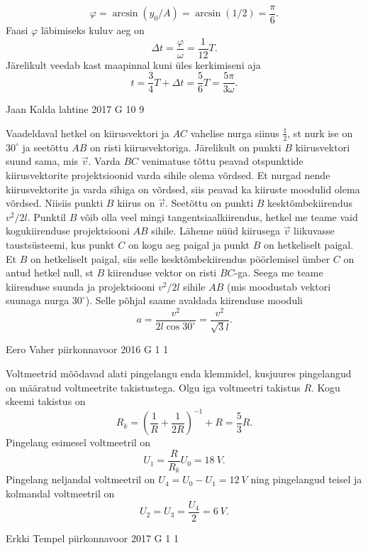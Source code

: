 \documentclass[11pt]{article}
\begin{document}
{{\[
\varphi = \arcsin(y_0/A) = \arcsin(1/2) = \frac{\pi}{6}.
\]
Faasi $\varphi$ läbimiseks kuluv aeg on
\[
\Delta t = \frac{\varphi}{\omega}=\frac{1}{12}T.
\]
Järelikult veedab kast maapinnal kuni üles kerkimiseni aja
\[
t = \frac{3}{4}T + \Delta t = \frac{5}{6}T = \frac{5\pi}{3\omega}.
\]
\fi
}

{Jaan Kalda} %
{lahtine} %
{2017} %
{G 10} %
{9} %
{

\ifSolution
Vaadeldaval hetkel on kiirusvektori ja $AC$ vahelise nurga siinus $\frac 12$, st nurk ise on $30^\circ$ ja seetõttu $AB$ on risti kiirusvektoriga. Järelikult on punkti $B$ kiirusvektori suund sama, mis $\vec v$. Varda $BC$ venimatuse tõttu peavad otspunktide kiirusvektorite projektsioonid varda sihile olema võrdsed. Et nurgad nende kiirusvektorite ja varda sihiga on võrdsed, siis peavad ka kiiruste moodulid olema võrdsed. Niisiis punkti $B$ kiirus on $\vec v$. Seetõttu on punkti $B$ kesktõmbekiirendus $v^2/2l$. Punktil $B$ võib olla veel mingi tangentsiaalkiirendus, hetkel me teame vaid kogukiirenduse projektsiooni $AB$ sihile. Läheme nüüd kiirusega $\vec v$ liikuvasse taustsüsteemi, kus punkt $C$ on kogu aeg paigal ja punkt $B$ on hetkeliselt paigal. Et $B$ on hetkeliselt paigal, siis selle kesktõmbekiirendus pöörlemisel ümber $C$ on antud hetkel null, st $B$ kiirenduse vektor on risti $BC$-ga. Seega me teame kiirenduse suunda ja projektsiooni $v^2/2l$ sihile $AB$ (mis moodustab vektori suunaga nurga $30^\circ$). Selle põhjal saame avaldada kiirenduse mooduli
\[
a=\frac{v^2}{2l\cos30^\circ}=\frac{v^2}{\sqrt 3l}.
\]
\fi
}

{Eero Vaher} %
{piirkonnavoor} %
{2016} %
{G 1} %
{1} %
{

\ifSolution
Voltmeetrid mõõdavad alati pingelangu enda klemmidel, kusjuures pingelangud on määratud voltmeetrite takistustega. Olgu iga voltmeetri takistus $R$. Kogu skeemi takistus on 
\[
R_k=\left(\frac{1}{R}+\frac{1}{2R}\right)^{-1}+R=\frac{5}{3}R.
\]
Pingelang esimesel voltmeetril on
\[
U_1=\frac{R}{R_k}U_0=\SI{18}{V}.
\]
Pingelang neljandal voltmeetril on $U_4=U_0-U_1=\SI{12}{V}$ ning pingelangud teisel ja kolmandal voltmeetril on 
\[
U_2=U_3=\frac{U_4}{2}=\SI{6}{V}.
\]
\fi
}

{Erkki Tempel} %
{piirkonnavoor} %
{2017} %
{G 1} %
{1} %
{

}}
\end{document}
